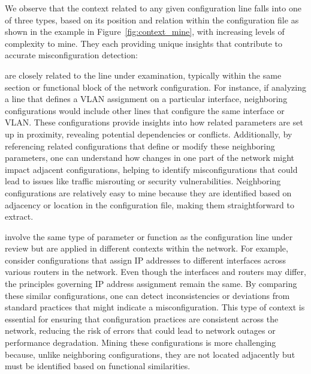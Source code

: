      We observe that
    the context related to any given configuration line falls into one of
    three types, based on its position and relation within the
    configuration file as shown in the example in
    Figure~\ref{fig:context_mine}, with increasing levels of complexity to
    mine. They each providing unique insights that contribute to accurate
    misconfiguration detection: 
    
     are closely related to the line under examination, typically within the same section or functional block of the network configuration. For instance, if analyzing a line that defines a VLAN assignment on a particular interface, neighboring configurations would include other lines that configure the same interface or VLAN. These configurations provide insights into how related parameters are set up in proximity, revealing potential dependencies or conflicts. Additionally, by referencing related configurations that define or modify these neighboring parameters, one can understand how changes in one part of the network might impact adjacent configurations, helping to identify misconfigurations that could lead to issues like traffic misrouting or security vulnerabilities. Neighboring configurations are relatively easy to mine because they are identified based on adjacency or location in the configuration file, making them straightforward to extract.
        
     involve the same type of parameter or function as the configuration line under review but are applied in different contexts within the network. For example, consider configurations that assign IP addresses to different interfaces across various routers in the network. Even though the interfaces and routers may differ, the principles governing IP address assignment remain the same. By comparing these similar configurations, one can detect inconsistencies or deviations from standard practices that might indicate a misconfiguration. This type of context is essential for ensuring that configuration practices are consistent across the network, reducing the risk of errors that could lead to network outages or performance degradation. Mining these configurations is more challenging because, unlike neighboring configurations, they are not located adjacently but must be identified based on functional similarities.


